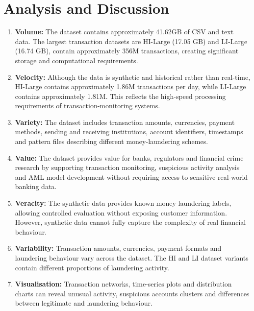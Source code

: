 \section{Analysis and Discussion}

\begin{enumerate}
    \item \textbf{Volume:}
            The dataset contains approximately 41.62GB of CSV and text data. The largest transaction datasets are HI-Large (17.05 GB) and LI-Large (16.74 GB), contain approximately 356M transactions, creating significant storage and computational requirements.
    \item \textbf{Velocity:}
            Although the data is synthetic and historical rather than real-time, HI-Large contains approximately 1.86M transactions per day, while LI-Large contains approximately 1.81M. This reflects the high-speed processing requirements of transaction-monitoring systems. 
    \item \textbf{Variety:}
            The dataset includes transaction amounts, currencies, payment methods, sending and receiving institutions, account identifiers, timestamps and pattern files describing different money-laundering schemes.
    \item \textbf{Value:}
            The dataset provides value for banks, regulators and financial crime research by supporting transaction monitoring, suspicious activity analysis and AML model development without requiring access to sensitive real-world banking data. 
    \item \textbf{Veracity:}
            The synthetic data provides known money-laundering labels, allowing controlled evaluation without exposing customer information. However, synthetic data cannot fully capture the complexity of real financial behaviour.
    \item \textbf{Variability:}
            Transaction amounts, currencies, payment formats and laundering behaviour vary across the dataset. The HI and LI dataset variants contain different proportions of laundering activity. 
    \item \textbf{Visualisation:}
            Transaction networks, time-series plots and distribution charts can reveal unusual activity, suspicious accounts clusters and differences between legitimate and laundering behaviour.
 
\end{enumerate}
 
 
 


